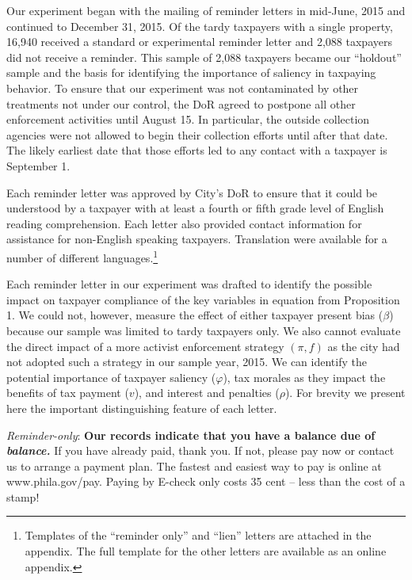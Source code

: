 \documentclass[12pt]{article}
\begin{document}
Our experiment began with the mailing of reminder
letters in mid-June, 2015 and continued to December 31, 2015.  Of the
tardy taxpayers with a single property, 16,940 received a standard or experimental
reminder letter and 2,088 taxpayers did not receive a
reminder.  This sample of 2,088 taxpayers became our ``holdout''
sample and the basis for identifying the importance of saliency in
taxpaying behavior. To ensure that our experiment was not contaminated
by other treatments not under our control, the DoR agreed to postpone
all other enforcement activities until August 15.  In particular, the
outside collection agencies were not allowed to begin their collection
efforts until after that date.  The likely earliest date that those
efforts led to any contact with a taxpayer is September 1.

Each reminder letter was
approved by City's DoR to ensure that it could be understood by a
taxpayer with at least a fourth or fifth grade level of English
reading comprehension.  Each letter also provided contact information
for assistance for non-English speaking taxpayers.  Translation were
available for a number of different languages.\footnote{Templates of the 
``reminder only'' and ``lien'' letters  are attached in the  appendix. 
The full  template for the other letters are available as an online appendix.} 

Each reminder letter in our experiment was drafted to identify the
possible impact on taxpayer compliance of the key variables in
equation from Proposition 1.  We could not, however, measure the effect of
either taxpayer present bias ($\beta$) because our sample was limited
to tardy taxpayers only. We also cannot evaluate the direct
impact of a more activist enforcement strategy $(\pi, f)$ as the city
had not adopted such a strategy in our sample year, 2015. We can identify the potential importance of taxpayer saliency
($\varphi$), tax morales as they impact the benefits of tax payment
($v$), and interest and penalties ($\rho$). 
 For
brevity we present here the important distinguishing feature of each
letter.

\bigskip

\noindent \textit{Reminder-only}: \textbf{Our records indicate 
that you have a balance due of \textit{balance. }} If you have 
already paid, thank you.  If not, please pay now or contact us 
to arrange a payment plan.  The fastest and easiest way to pay is 
online at  www.phila.gov/pay. Paying by E-check only costs 35 cent 
-- less than the cost of a stamp!
\end{document}
